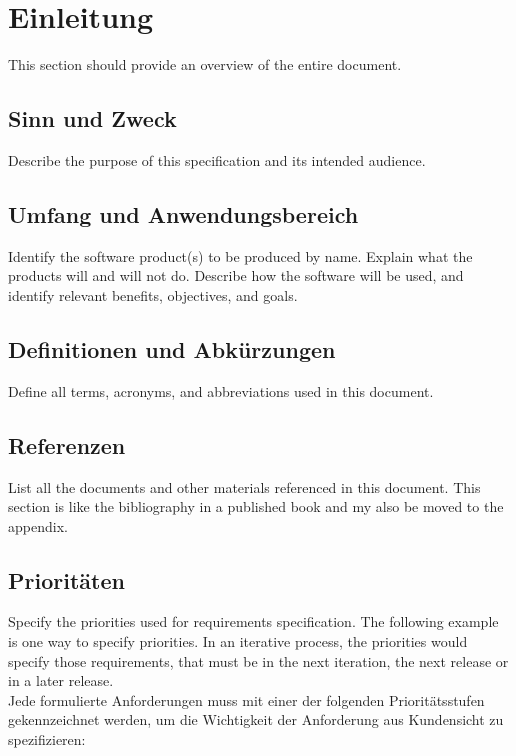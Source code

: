 \newpage
\renewcommand*\contentsname{\hfill Inhaltsverzeichnis \hfill} %
\tableofcontents
\newpage

\setcounter{secnumdepth}{3} 		%
\section{Einleitung}
This section should provide an overview of the entire document.

\subsection{Sinn und Zweck}
Describe the purpose of this specification and its intended audience.

\subsection{Umfang und Anwendungsbereich}
Identify the software product(s) to be produced by name. Explain what the products will and will not do. Describe how the software will be used, and identify relevant benefits, objectives, and goals.

\subsection{Definitionen und Abkürzungen}
Define all terms, acronyms, and abbreviations used in this document.

\subsection{Referenzen}
List all the documents and other materials referenced in this document. This section is like the bibliography in a published book and my also be moved to the appendix.

\subsection{Prioritäten}
Specify the priorities used for requirements specification. The following example is one way to specify priorities. In an iterative process, the priorities would specify those requirements, that must be in the next iteration, the next release or in a later release. \\[-0.3cm]

\noindent Jede formulierte Anforderungen muss mit einer der folgenden Prioritätsstufen gekennzeichnet werden, um die Wichtigkeit der Anforderung aus Kundensicht zu spezifizieren: \\[0.1cm]

